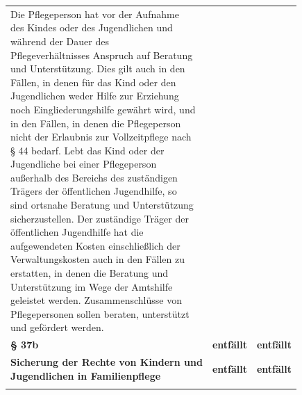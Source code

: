 \documentclass[10pt,a4paper,landscape]{article}
\begin{document}
\begin{longtable}{|L{8.2cm}|L{8.2cm}|L{8.2cm}|}
\textcolor{diffred}{Die Pflegeperson hat vor der Aufnahme  \newline des Kindes oder des Jugendlichen und  \newline während der Dauer des  \newline Pflegeverhältnisses Anspruch auf Beratung  \newline und Unterstützung. Dies gilt auch in den  \newline Fällen, in denen für das Kind oder den  \newline Jugendlichen weder Hilfe zur Erziehung  \newline noch Eingliederungshilfe gewährt wird, und  \newline in den Fällen, in denen die Pflegeperson  \newline nicht der Erlaubnis zur Vollzeitpflege nach  \newline \S{} 44 bedarf. Lebt das Kind oder der  \newline Jugendliche bei einer Pflegeperson  \newline außerhalb des Bereichs des zuständigen  \newline Trägers der öffentlichen Jugendhilfe, so  \newline sind ortsnahe Beratung und Unterstützung  \newline sicherzustellen. Der zuständige Träger der  \newline öffentlichen Jugendhilfe hat die  \newline aufgewendeten Kosten einschließlich der  \newline Verwaltungskosten auch in den Fällen zu  \newline erstatten, in denen die Beratung und  \newline Unterstützung im Wege der Amtshilfe  \newline geleistet werden. Zusammenschlüsse von  \newline Pflegepersonen sollen beraten, unterstützt  \newline und gefördert werden. } &  &  \\
\hhline{|---|}
\textbf{\textcolor{diffred}{\S{} 37b}} & \textbf{entfällt} & \textbf{entfällt} \\
\hhline{|---|}
\textbf{\textcolor{diffred}{Sicherung der Rechte von Kindern und  \newline Jugendlichen in Familienpflege}} & \textbf{entfällt} & \textbf{entfällt} \\
\hhline{|---|}

\end{longtable}
\end{document}
